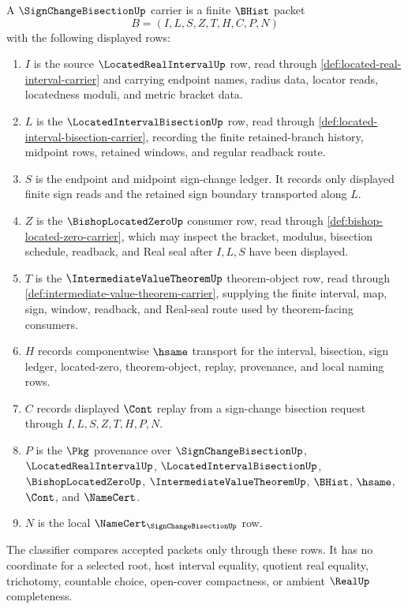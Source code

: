 \begin{definition}
\label{def:sign-change-bisection-namecert-surface}
A $\SignChangeBisectionUp$ carrier is a finite $\BHist$ packet
$$
B=(I,L,S,Z,T,H,C,P,N)
$$
with the following displayed rows:
\begin{enumerate}
\item $I$ is the source $\LocatedRealIntervalUp$ row, read through \autoref{def:located-real-interval-carrier} and carrying endpoint names, radius data, locator reads, locatedness moduli, and metric bracket data.
\item $L$ is the $\LocatedIntervalBisectionUp$ row, read through \autoref{def:located-interval-bisection-carrier}, recording the finite retained-branch history, midpoint rows, retained windows, and regular readback route.
\item $S$ is the endpoint and midpoint sign-change ledger. It records only displayed finite sign reads and the retained sign boundary transported along $L$.
\item $Z$ is the $\BishopLocatedZeroUp$ consumer row, read through \autoref{def:bishop-located-zero-carrier}, which may inspect the bracket, modulus, bisection schedule, readback, and Real seal after $I,L,S$ have been displayed.
\item $T$ is the $\IntermediateValueTheoremUp$ theorem-object row, read through \autoref{def:intermediate-value-theorem-carrier}, supplying the finite interval, map, sign, window, readback, and Real-seal route used by theorem-facing consumers.
\item $H$ records componentwise $\hsame$ transport for the interval, bisection, sign ledger, located-zero, theorem-object, replay, provenance, and local naming rows.
\item $C$ records displayed $\Cont$ replay from a sign-change bisection request through $I,L,S,Z,T,H,P,N$.
\item $P$ is the $\Pkg$ provenance over $\SignChangeBisectionUp$, $\LocatedRealIntervalUp$, $\LocatedIntervalBisectionUp$, $\BishopLocatedZeroUp$, $\IntermediateValueTheoremUp$, $\BHist$, $\hsame$, $\Cont$, and $\NameCert$.
\item $N$ is the local $\NameCert_{\SignChangeBisectionUp}$ row.
\end{enumerate}
The classifier compares accepted packets only through these rows. It has no coordinate for a selected root, host interval equality, quotient real equality, trichotomy, countable choice, open-cover compactness, or ambient $\RealUp$ completeness.
\end{definition}

